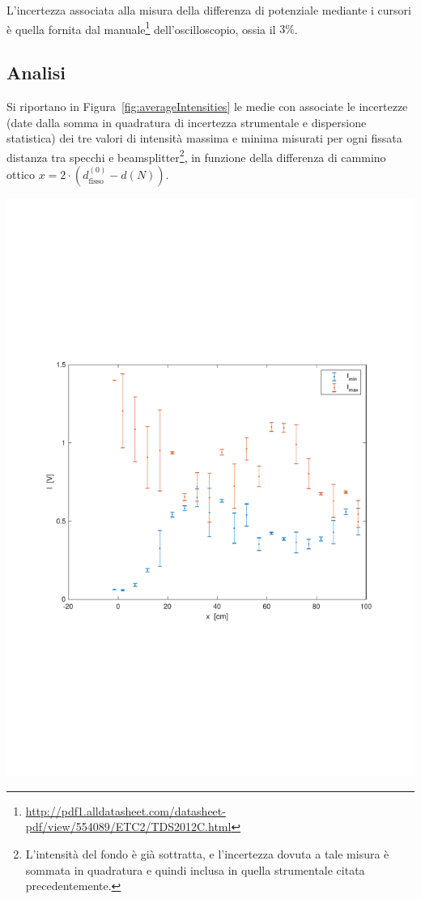 \documentclass[10pt,oneside,a4paper]{article}
\newenvironment{Figure}
  {\par\medskip\noindent\minipage{\linewidth}}
  {\endminipage\par\medskip}
\begin{document}
\begin{multicols}{2}
L'incertezza associata alla misura della differenza di potenziale mediante i cursori è quella fornita dal manuale\footnote{\url{http://pdf1.alldatasheet.com/datasheet-pdf/view/554089/ETC2/TDS2012C.html}} dell'oscilloscopio, ossia il $3\%$.

\subsection{Analisi}
Si riportano in Figura~\ref{fig:averageIntensities} le medie con associate le incertezze (date dalla somma in quadratura di incertezza strumentale e dispersione statistica) dei tre valori di intensità massima e minima misurati per ogni fissata distanza tra specchi e beamsplitter\footnote{L'intensità del fondo è già sottratta, e l'incertezza dovuta a tale misura è sommata in quadratura e quindi inclusa in quella strumentale citata precedentemente.}, in funzione della differenza di cammino ottico $x = 2\cdot \left(d^{(0)}_\mathrm{fisso} - d(N)\right)$.

\begin{Figure}
	\begin{center}
	\includegraphics[width=\linewidth]{<Imax-min>_vs_tau.pdf}
	\label{fig:averageIntensities}
	\end{center}
\end{Figure}


\end{multicols}
\end{document}
